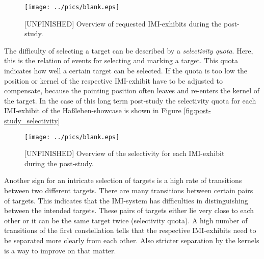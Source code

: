 
\begin{figure}[H]%
\texttt{[image: ../pics/blank.eps]}%
\caption{[UNFINISHED] Overview of requested \ac{IMI}-exhibits during the post-study.}%
\label{fig:post-study_selections} %
\end{figure}

The difficulty of selecting a target can be described by a \textit{selectivity quota}. Here, this is the relation of events for selecting and marking a target. This quota indicates how well a certain target can be selected. If the quota is too low the position or kernel of the respective \ac{IMI}-exhibit have to be adjusted to compensate, because the pointing position often leaves and re-enters the kernel of the target. In the case of this long term post-study the selectivity quota for each \ac{IMI}-exhibit of the Haßleben-showcase is shown in Figure \ref{fig:post-study_selectivity}
\begin{figure}[H]%
\texttt{[image: ../pics/blank.eps]}%
\caption{[UNFINISHED] Overview of the selectivity for each \ac{IMI}-exhibit during the post-study.}
\label{fig:post-study_selections} %
\end{figure}

Another sign for an intricate selection of targets is a high rate of transitions between two different targets. There are many transitions between certain pairs of targets. This indicates that the \ac{IMI}-system has difficulties in distinguishing between the intended targets. These pairs of targets either lie very close to each other or it can be the same target twice (selectivity quota). A high number of transitions of the first constellation tells that the respective \ac{IMI}-exhibits need to be separated more clearly from each other. Also stricter separation by the kernels is a way to improve on that matter.

